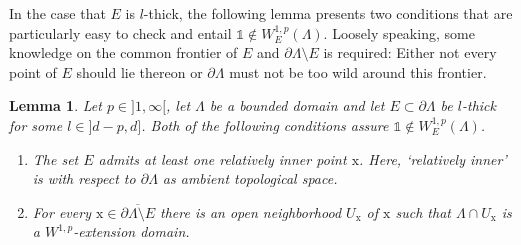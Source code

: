 \documentclass[10pt,leqno]{amsart}
\newtheorem{lemma}[theorem]{Lemma}
\theoremstyle{definition}
\numberwithin{equation}{section}
\begin{document}
In the case that $E$ is $l$-thick, the following lemma presents two
conditions that are particularly easy to check and entail $\mathds 1 \notin
W^{1,p}_E(\Lambda)$. Loosely speaking, some knowledge on the common frontier of
$E$ and $\partial \Lambda \setminus E$ is required: Either not every point of
$E$ should lie thereon or $\partial \Lambda$ must not be too wild around this
frontier. 

\begin{lemma} \label{l-constantzero}
Let $p \in {]1,\infty[}$, let $\Lambda$ be a bounded domain and let $E \subset
\partial \Lambda$ be $l$-thick for some $l \in {]d-p,d]}$. Both of the
following conditions assure $\mathds 1 \notin W_E^{1,p}(\Lambda)$.
 \begin{enumerate}
  \item \label{l-constantzero:i} The set $E$ admits at least one relatively
  inner point ${{\mathrm x}}$. Here, `relatively inner' is with  respect to $\partial
  \Lambda$ as ambient topological space.
  \item \label{l-constantzero:ii} For every ${{\mathrm x}} \in \overline{\partial \Lambda
\setminus E}$ there is an open neighborhood $U_{{\mathrm x}}$ of $ {{\mathrm x}}$ such that $\Lambda
\cap U_\mathrm x$ is a $W^{1,p}$-extension domain.
\end{enumerate}
\end{lemma}
\end{document}
